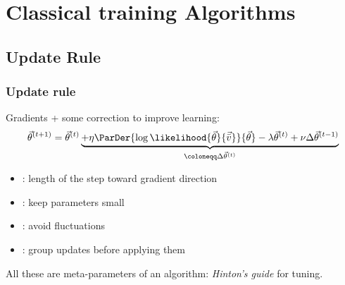 
\section{Classical training Algorithms}
\subsection{Update Rule}
\begin{frame}
  \frametitle{Update rule}
  Gradients + some correction to improve learning:
  \[
  \vec{\theta}^{(t+1)} = \vec{\theta}^{(t)}
  \underbrace{
    + \eta \ParDer{\log\likelihood{\vec{\theta}}{\vec{\bar{v}}}}{\vec{\theta}}
    - \lambda \vec{\theta}^{(t)}
    + \nu \Delta\vec{\theta}^{(t-1)}
  }_{\coloneqq \Delta\vec{\theta}^{(t)}}
  \]
  \begin{itemize}
    \item {}: length of the step toward gradient direction
    \item {}: keep parameters small
    \item {}: avoid fluctuations
    \item {}: group updates before applying them 
  \end{itemize}
  All these are \alert{meta-parameters} of an algorithm:
  \emph{Hinton's guide} \cite{hinton2012practical} for tuning.
\end{frame}

